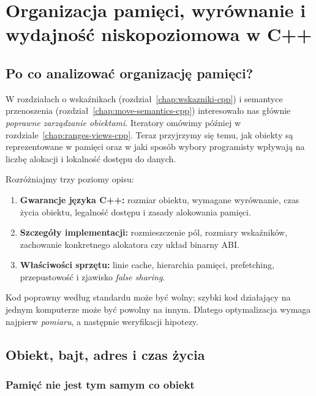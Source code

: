 
\chapter[Organizacja pamięci i wydajność]{Organizacja pamięci, wyrównanie i wydajność niskopoziomowa w C++}
\label{chap:cpp-memory-performance}

\section{Po co analizować organizację pamięci?}

W rozdziałach o wskaźnikach (rozdział~\ref{chap:wskazniki-cpp})
i semantyce przenoszenia (rozdział~\ref{chap:move-semantics-cpp})
interesowało nas głównie \emph{poprawne zarządzanie obiektami}.
Iteratory omówimy później w rozdziale~\ref{chap:ranges-views-cpp}.
Teraz przyjrzymy się temu, jak
obiekty są reprezentowane w pamięci oraz w jaki sposób wybory
programisty wpływają na liczbę alokacji i lokalność dostępu do danych.

Rozróżniajmy trzy poziomy opisu:
\begin{enumerate}
\item \textbf{Gwarancje języka C++:} rozmiar obiektu, wymagane wyrównanie,
      czas życia obiektu, legalność dostępu i zasady alokowania pamięci.
\item \textbf{Szczegóły implementacji:} rozmieszczenie pól, rozmiary
      wskaźników, zachowanie konkretnego alokatora czy układ binarny ABI.
\item \textbf{Właściwości sprzętu:} linie cache, hierarchia pamięci,
      prefetching, przepustowość i zjawisko \emph{false sharing}.
\end{enumerate}

Kod poprawny według standardu może być wolny; szybki kod działający
na jednym komputerze może być powolny na innym. Dlatego optymalizacja
wymaga najpierw \emph{pomiaru}, a następnie weryfikacji hipotezy.

\section{Obiekt, bajt, adres i czas życia}
\label{sec:cpp10-object}

\subsection{Pamięć nie jest tym samym co obiekt}

